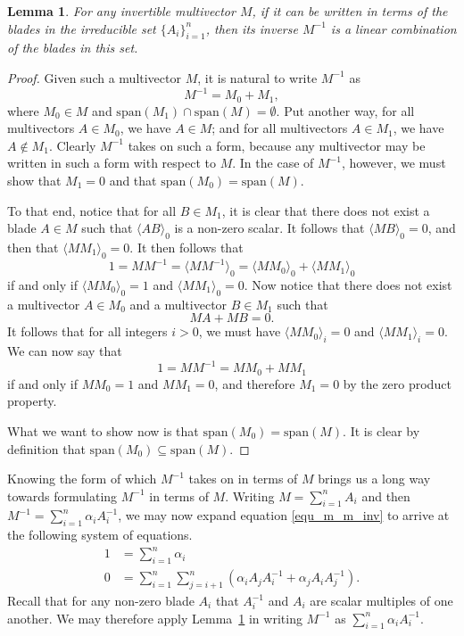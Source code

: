 \documentclass[12pt]{article}
\newtheorem{lemma}{Lemma}[section]
\begin{document}
\begin{lemma}\label{lem_inverse_form}
For any invertible multivector $M$, if it can be written in
terms of the blades in the irreducible set $\{A_i\}_{i=1}^n$, then its inverse $M^{-1}$ is a linear
combination of the blades in this set.
\end{lemma}
\begin{proof}
Given such a multivector $M$, it is natural to write $M^{-1}$ as
\begin{equation}
M^{-1} = M_0 + M_1,
\end{equation}
where $M_0\in M$ and $\mbox{span}(M_1)\cap\mbox{span}(M)=\emptyset$.
Put another way, for all multivectors $A\in M_0$, we have $A\in M$; and for
all multivectors $A\in M_1$, we have $A\not\in M_1$.
Clearly $M^{-1}$ takes on such
a form, because any multivector may be written in such a form with respect to $M$.
In the case of $M^{-1}$, however, we must show that $M_1=0$ and
that $\mbox{span}(M_0)=\mbox{span}(M)$.

To that end, notice that for all $B\in M_1$, it is clear that there
does not exist a blade $A\in M$ such that $\langle AB\rangle_0$ is a non-zero scalar.
It follows that $\langle MB\rangle_0=0$, and then that $\langle MM_1\rangle_0=0$.
It then follows that
\begin{equation}
1 = MM^{-1} = \langle MM^{-1}\rangle_0 = \langle MM_0\rangle_0 + \langle MM_1\rangle_0
\end{equation}
if and only if $\langle MM_0\rangle_0=1$ and $\langle MM_1\rangle_0=0$.
Now notice that there does not exist a multivector $A\in M_0$ and a multivector
$B\in M_1$ such that
\begin{equation}
MA+MB=0.
\end{equation}
It follows that for all integers $i>0$, we must have $\langle MM_0\rangle_i=0$
and $\langle MM_1\rangle_i=0$.  We can now say that
\begin{equation}
1 = MM^{-1} = MM_0 + MM_1
\end{equation}
if and only if $MM_0=1$ and $MM_1=0$, and therefore
$M_1=0$ by the zero product property.

What we want to show now is that $\mbox{span}(M_0)=\mbox{span}(M)$.
It is clear by definition that $\mbox{span}(M_0)\subseteq\mbox{span}(M)$.
\end{proof}

Knowing the form of which $M^{-1}$ takes on
in terms of $M$ brings us a long way towards formulating $M^{-1}$
in terms of $M$.  Writing $M=\sum_{i=1}^n A_i$ and then
$M^{-1}=\sum_{i=1}^n \alpha_i A_i^{-1}$, we may now expand
equation \eqref{equ_m_m_inv} to arrive at the following system of equations.
\begin{align}
1 &= \sum_{i=1}^n \alpha_i \\
0 &= \sum_{i=1}^n\sum_{j=i+1}^n\left(\alpha_iA_jA_i^{-1}+\alpha_jA_iA_j^{-1}\right).
\end{align}
Recall that for any non-zero blade $A_i$ that $A_i^{-1}$ and $A_i$ are scalar multiples
of one another.  We may therefore apply Lemma~\ref{lem_inverse_form} in writing $M^{-1}$
as $\sum_{i=1}^n \alpha_i A_i^{-1}$.
\end{document}

